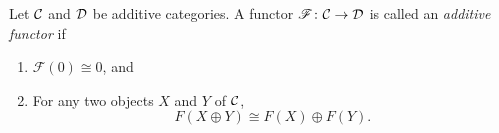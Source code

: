 \documentclass[dissertation.tex]{subfiles}
\begin{document}
\begin{defn}
  Let $\mathcal{C}$ and $\mathcal{D}$ be additive categories.
  A functor $\mathscr{F} \colon \mathcal{C} \rightarrow \mathcal{D}$ is called an {\it additive functor} if 
  \begin{enumerate}
  \item
    $\mathscr{F}(0) \cong 0$, and
  \item
    For any two objects $X$ and $Y$ of $\mathcal{C}$,
    $$F(X \oplus Y) \cong F(X) \oplus F(Y).$$
  \end{enumerate}
\end{defn}
\end{document}
